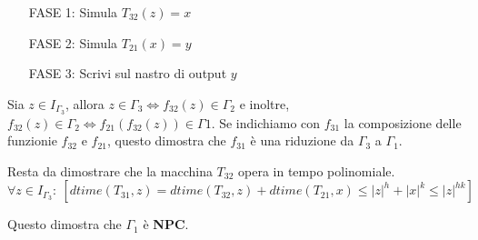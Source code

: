 \begin{itemize}
    \item [FASE 1: ] Simula $T_{32}(z) = x$
    \item [FASE 2: ] Simula $T_{21}(x) = y$
    \item [FASE 3: ] Scrivi sul nastro di output $y$
\end{itemize}

Sia $z \in I_{\Gamma_{3}}$, allora $z \in \Gamma_{3} \Leftrightarrow f_{32}(z) \in \Gamma_{2}$ e inoltre, $f_{32}(z) \in \Gamma_{2} \Leftrightarrow f_{21}(f_{32}(z)) \in \Gamma{1}$.
Se indichiamo con $f_{31}$ la composizione delle funzionie $f_{32}$ e $f_{21}$, questo dimostra che $f_{31}$ è una riduzione da $\Gamma_{3}$ a $\Gamma_{1}$.

Resta da dimostrare che la macchina $T_{32}$ opera in tempo polinomiale. 
\[
\forall z \in I_{\Gamma_{3}}:\ [dtime(T_{31}, z) = dtime(T_{32}, z) + dtime(T_{21}, x) \leq |z|^h + |x|^k \leq |z|^{hk}]    
\]

Questo dimostra che $\Gamma_{1}$ è \textbf{NPC}.
